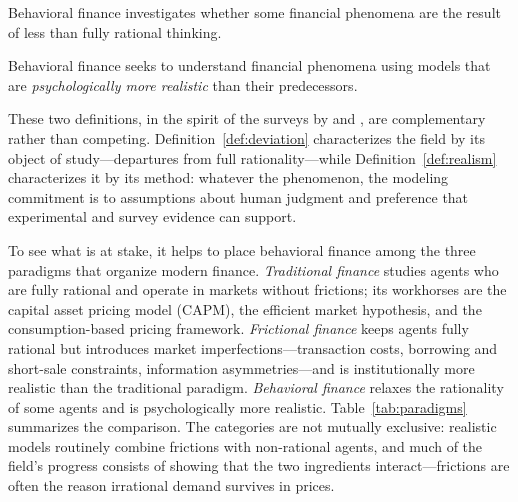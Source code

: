 \begin{definition}
\label{def:deviation}
Behavioral finance investigates whether some financial phenomena are the result of less than fully rational thinking.
\end{definition}

\begin{definition}
\label{def:realism}
Behavioral finance seeks to understand financial phenomena using models that are \emph{psychologically more realistic} than their predecessors.
\end{definition}

These two definitions, in the spirit of the surveys by \citet{barberis2003} and \citet{ritter2003}, are complementary rather than competing. Definition~\ref{def:deviation} characterizes the field by its object of study---departures from full rationality---while Definition~\ref{def:realism} characterizes it by its method: whatever the phenomenon, the modeling commitment is to assumptions about human judgment and preference that experimental and survey evidence can support.

To see what is at stake, it helps to place behavioral finance among the three paradigms that organize modern finance. \emph{Traditional finance} studies agents who are fully rational and operate in markets without frictions; its workhorses are the capital asset pricing model (CAPM), the efficient market hypothesis, and the consumption-based pricing framework. \emph{Frictional finance} keeps agents fully rational but introduces market imperfections---transaction costs, borrowing and short-sale constraints, information asymmetries---and is institutionally more realistic than the traditional paradigm. \emph{Behavioral finance} relaxes the rationality of some agents and is psychologically more realistic. Table~\ref{tab:paradigms} summarizes the comparison. The categories are not mutually exclusive: realistic models routinely combine frictions with non-rational agents, and much of the field's progress consists of showing that the two ingredients interact---frictions are often the reason irrational demand survives in prices.

